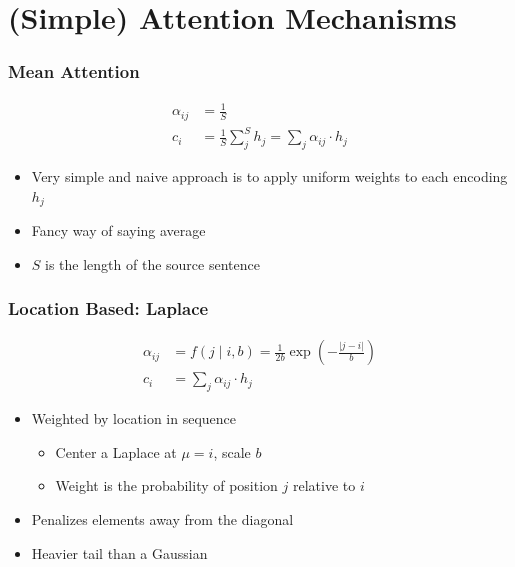 \documentclass[usenames,dvipsnames]{beamer}
\begin{document}
\section{(Simple) Attention Mechanisms}

\begin{frame}
\frametitle{Mean Attention}
\begin{equation*}
  \begin{split}
  \alpha_{ij} &= \frac{1}{S} \\
  c_i &= \frac{1}{S} \sum_j^S h_j = \sum_{j} \alpha_{ij} \cdot h_j
  \end{split}
\end{equation*}
\begin{itemize}
  \item Very simple and naive approach is to apply uniform weights to each encoding $h_j$
  \item Fancy way of saying average
  \item $S$ is the length of the source sentence
\end{itemize}
\end{frame}

\begin{frame}
\frametitle{Location Based: Laplace}
\begin{equation*}
  \begin{split}
  \alpha_{ij} &= f \left(j \mid i, b \right) = \frac{1}{2b} \exp \left( - \frac{\lvert j - i \rvert}{b} \right) \\
  c_i &= \sum_{j} \alpha_{ij} \cdot h_j
  \end{split}
\end{equation*}
\begin{itemize}
  \item Weighted by location in sequence
  \begin{itemize}
    \item Center a Laplace at $\mu=i$, scale $b$
    \item Weight is the probability of position $j$ relative to $i$
  \end{itemize}
  \item Penalizes elements away from the diagonal
  \item Heavier tail than a Gaussian
\end{itemize}
\end{frame}
\end{document}
